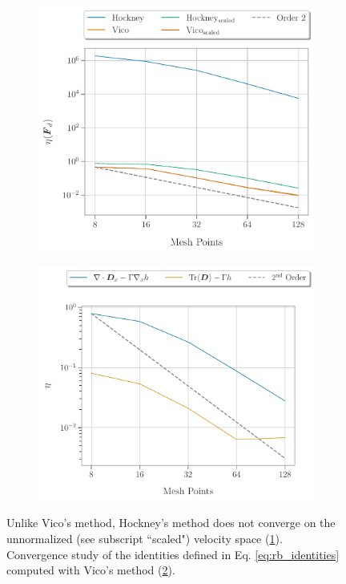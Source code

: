 \begin{figure}[h]
  \begin{subfigure}[b]{0.5\textwidth}
    \includegraphics[width=\textwidth]{figures/results/convergenceStudy/Fd_joint_comparison.pdf}
    \caption{}
    \label{fig:Fd_joint_comparison}
  \end{subfigure}
  \hfill
  \begin{subfigure}[b]{0.524\textwidth}
    \includegraphics[width=\textwidth]{figures/results/convergenceStudy/identities_convergence_sigma005vmax_VICO.pdf}
    \caption{}
    \label{fig:identities_convergence_VICO}
  \end{subfigure}
  \caption{Unlike Vico's method, Hockney's method does not converge on the unnormalized
      (see subscript ``scaled")
  velocity space (\ref{fig:Fd_joint_comparison}). Convergence study of the identities defined
in Eq. \ref{eq:rb_identities} computed with Vico's method (\ref{fig:identities_convergence_VICO}).}
\label{fig:joint_Fdconvergence_identities}
\end{figure}

